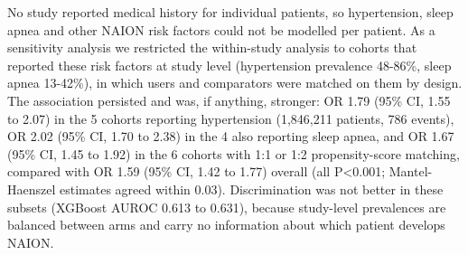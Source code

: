 \documentclass[journal]{IEEEtran}
\begin{document}
No study reported medical history for individual patients, so
hypertension, sleep apnea and other NAION risk factors could not be
modelled per patient. As a sensitivity analysis we restricted the
within-study analysis to cohorts that reported these risk factors at
study level (hypertension prevalence 48-86\%, sleep apnea 13-42\%), in
which users and comparators were matched on them by design. The
association persisted and was, if anything, stronger: OR 1.79 (95\% CI,
1.55 to 2.07) in the 5 cohorts reporting hypertension (1,846,211
patients, 786 events), OR 2.02 (95\% CI, 1.70 to 2.38) in the 4 also
reporting sleep apnea, and OR 1.67 (95\% CI, 1.45 to 1.92) in the 6
cohorts with 1:1 or 1:2 propensity-score matching, compared with OR 1.59
(95\% CI, 1.42 to 1.77) overall (all P\textless0.001; Mantel-Haenszel
estimates agreed within 0.03). Discrimination was not better in these
subsets (XGBoost AUROC 0.613 to 0.631), because study-level prevalences
are balanced between arms and carry no information about which patient
develops NAION.

\begin{table}[!htbp]\centering\caption{Sensitivity analysis restricted to cohorts reporting NAION risk-factor
prevalence at study level (hypertension; hypertension and obstructive
sleep apnea; 1:1 or 1:2 propensity-score matching). OR = within-study
odds ratio for GLP-1RA exposure (count-weighted logistic regression with
study fixed effects) with 95\% CI; MH OR = Mantel-Haenszel odds ratio;
I2 = between-study heterogeneity; XGBoost AUROC = mean over ten disjoint
10\% training folds. Remaining abbreviations and variable names:
Nomenclature appendix.}\scriptsize
{}
\end{table}
\end{document}
